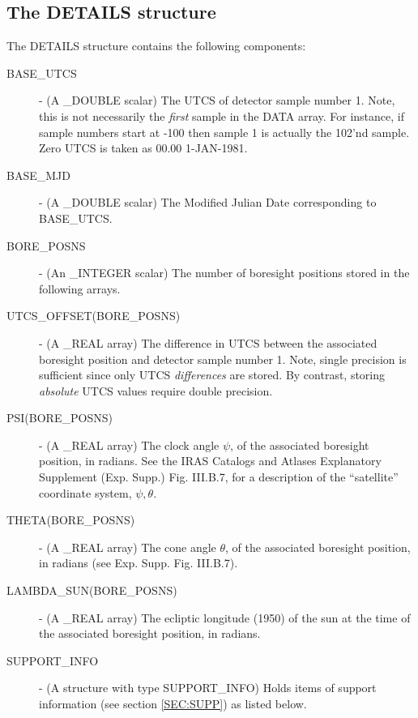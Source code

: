 \subsection{ The DETAILS structure}
The DETAILS structure contains the following components:
\begin {description}

\item [BASE\_UTCS] - (A \_DOUBLE scalar) The UTCS of detector sample number 1.
Note, this is not necessarily the {\em first} sample in the DATA array. For
instance, if sample numbers start at -100 then sample 1 is actually the 102'nd
sample. Zero UTCS is taken as 00.00 1-JAN-1981. 

\item [BASE\_MJD] - (A \_DOUBLE scalar) The Modified Julian Date 
corresponding to BASE\_UTCS. 

\item [BORE\_POSNS] - (An \_INTEGER scalar) The number of boresight positions 
stored in the following arrays. 

\item [UTCS\_OFFSET(BORE\_POSNS)] -  (A \_REAL array) The difference in UTCS 
between the associated boresight position and detector sample number 1. Note, 
single precision is sufficient since only UTCS {\em differences} are stored.
By contrast, storing {\em absolute} UTCS values require double precision.

\item [PSI(BORE\_POSNS)] -  (A \_REAL array) The clock angle $\psi$, of the
associated boresight position, in radians. See the IRAS Catalogs and Atlases
Explanatory Supplement (Exp. Supp.) Fig. III.B.7,  for a description of the
``satellite'' coordinate system, ${\psi,\theta}$. 

\item [THETA(BORE\_POSNS)] -  (A \_REAL array) The cone angle $\theta$, of the 
associated boresight position, in radians (see Exp. Supp. Fig. III.B.7).

\item [LAMBDA\_SUN(BORE\_POSNS)] -  (A \_REAL array) The ecliptic longitude
(1950) of the sun at the time of the associated boresight position, in radians. 

\item [SUPPORT\_INFO] - (A structure with type SUPPORT\_INFO) Holds items of 
support information (see section \ref {SEC:SUPP}) as listed below.

\end{description}

